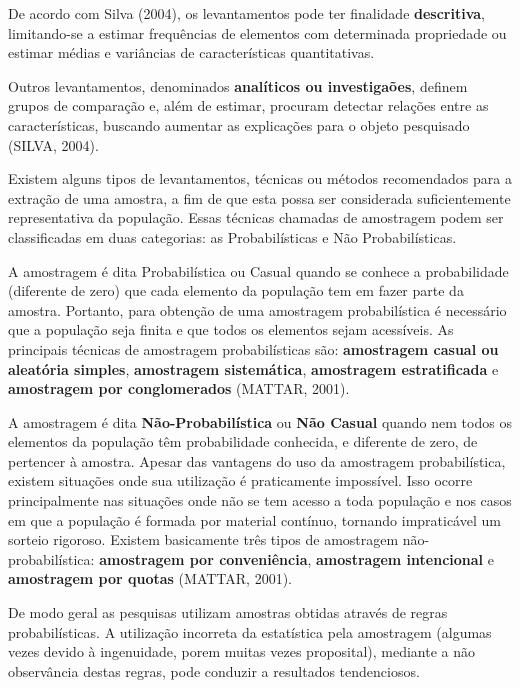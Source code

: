 De acordo com Silva (2004), os levantamentos pode ter finalidade
\textbf{descritiva}, limitando-se a estimar frequências de
elementos com determinada propriedade ou estimar médias e
variâncias de características quantitativas.\vskip0.3cm

Outros levantamentos, denominados \textbf{analíticos ou
investigaões}, definem grupos de comparação e, além de estimar,
procuram detectar relações entre as características, buscando
aumentar as explicações para o objeto pesquisado (SILVA,
2004).\vskip0.3cm

Existem alguns tipos de levantamentos, técnicas ou métodos recomendados para a extração de uma amostra, a fim de que esta possa ser considerada suficientemente representativa da população. Essas técnicas chamadas de amostragem podem ser classificadas em duas categorias: as Probabilísticas e Não Probabilísticas.\vskip0.3cm

A amostragem é dita Probabilística ou Casual quando se conhece a probabilidade (diferente de zero) que cada elemento da população tem em fazer parte da amostra. Portanto, para obtenção de uma amostragem probabilística é necessário que a população seja finita e que todos os elementos sejam acessíveis. As principais técnicas de amostragem probabilísticas são: \textbf{amostragem casual ou aleatória simples}, \textbf{amostragem sistemática}, \textbf{amostragem estratificada} e \textbf{amostragem por conglomerados} (MATTAR, 2001).\vskip0.3cm

A amostragem é dita \textbf{Não-Probabilística} ou \textbf{Não Casual} quando nem todos os elementos da população têm probabilidade conhecida, e diferente de zero, de pertencer à amostra. Apesar das vantagens do uso da amostragem probabilística, existem situações onde sua utilização é praticamente impossível.
Isso ocorre principalmente nas situações onde não se tem acesso a toda população e nos casos em que a população é formada por material contínuo, tornando impraticável um sorteio rigoroso. Existem basicamente três tipos de amostragem não-probabilística: \textbf{amostragem por conveniência}, \textbf{amostragem intencional} e \textbf{amostragem por quotas} (MATTAR, 2001).\vskip0.3cm

De modo geral as pesquisas utilizam amostras obtidas através de regras probabilísticas. A utilização incorreta da estatística pela amostragem (algumas vezes devido à ingenuidade, porem muitas vezes proposital), mediante a não observância destas regras, pode conduzir a resultados tendenciosos.\vskip0.3cm

